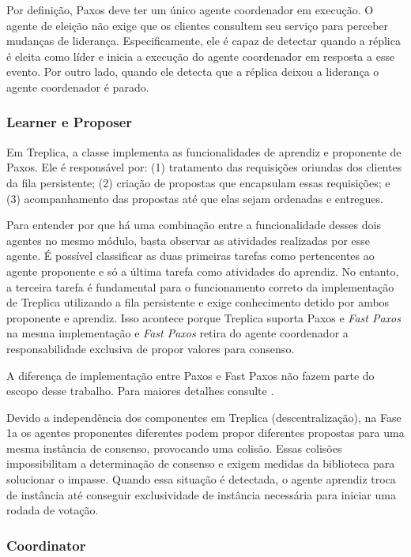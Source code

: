 Por definição, Paxos deve ter um único agente coordenador em execução. O agente de eleição
não exige que os clientes consultem seu serviço para perceber mudanças de liderança.
Especificamente, ele é capaz de detectar quando a réplica é eleita como líder e inicia a
execução do agente coordenador em resposta a esse evento. Por outro lado, quando ele
detecta que a réplica deixou a liderança o agente coordenador é parado.

\subsubsection{Learner e Proposer}

Em Treplica, a classe  implementa as funcionalidades de aprendiz e
proponente de Paxos. Ele é responsável por: (1) tratamento das requisições oriundas dos
clientes da fila persistente; (2) criação de propostas que encapsulam essas requisições; e
(3) acompanhamento das propostas até que elas sejam ordenadas e entregues.

Para entender por que há uma combinação entre a funcionalidade desses dois agentes no
mesmo módulo, basta observar as atividades realizadas por esse agente. É possível
classificar as duas primeiras tarefas como pertencentes ao agente proponente e só a última
tarefa como atividades do aprendiz. No entanto, a terceira tarefa é fundamental para
o funcionamento correto da implementação de Treplica utilizando a fila persistente e exige
conhecimento detido por ambos proponente e aprendiz. Isso acontece porque Treplica
suporta Paxos e \emph{Fast Paxos} \cite{lamport06a} na mesma implementação e \emph{Fast
Paxos} retira do agente coordenador a responsabilidade exclusiva de propor valores para
consenso.

A diferença de implementação entre Paxos e Fast Paxos não fazem parte do escopo desse
trabalho. Para maiores detalhes consulte .

Devido a independência dos componentes em Treplica (descentralização), na Fase 1a os
agentes proponentes diferentes podem propor diferentes propostas para uma mesma instância
de consenso, provocando uma colisão. Essas colisões impossibilitam a determinação de
consenso e exigem medidas da biblioteca para solucionar o impasse. Quando essa situação é
detectada, o agente aprendiz troca de instância até conseguir exclusividade de instância
necessária para iniciar uma rodada de votação.

\subsubsection{Coordinator}

